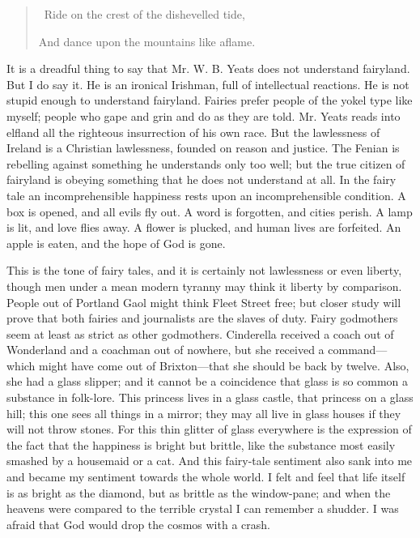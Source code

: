 \documentclass{book}
\begin{document}
\begin{quotation}\
	Ride on the crest of the dishevelled tide,

	And dance upon the mountains like aflame.
\end{quotation}

It is a dreadful thing to say that Mr. W. B. Yeats does not understand fairyland. But I do say it. He is an ironical Irishman, full of intellectual reactions. He is not stupid enough to understand fairyland. Fairies prefer people of the yokel type like myself; people who gape and grin and do as they are told. Mr. Yeats reads into elfland all the righteous insurrection of his own race. But the lawlessness of Ireland is a Christian lawlessness, founded on reason and justice. The Fenian is rebelling against something he understands only too well; but the true citizen of fairyland is obeying something that he does not understand at all. In the fairy tale an incomprehensible happiness rests upon an incomprehensible condition. A box is opened, and all evils fly out. A word is forgotten, and cities perish. A lamp is lit, and love flies away. A flower is plucked, and human lives are forfeited. An apple is eaten, and the hope of God is gone.

This is the tone of fairy tales, and it is certainly not lawlessness or even liberty, though men under a mean modern tyranny may think it liberty by comparison. People out of Portland Gaol might think Fleet Street free; but closer study will prove that both fairies and journalists are the slaves of duty. Fairy godmothers seem at least as strict as other godmothers. Cinderella received a coach out of Wonderland and a coachman out of nowhere, but she received a command—which might have come out of Brixton—that she should be back by twelve. Also, she had a glass slipper; and it cannot be a coincidence that glass is so common a substance in folk-lore. This princess lives in a glass castle, that princess on a glass hill; this one sees all things in a mirror; they may all live in glass houses if they will not throw stones. For this thin glitter of glass everywhere is the expression of the fact that the happiness is bright but brittle, like the substance most easily smashed by a housemaid or a cat. And this fairy-tale sentiment also sank into me and became my sentiment towards the whole world. I felt and feel that life itself is as bright as the diamond, but as brittle as the window-pane; and when the heavens were compared to the terrible crystal I can remember a shudder. I was afraid that God would drop the cosmos with a crash.
\end{document}
